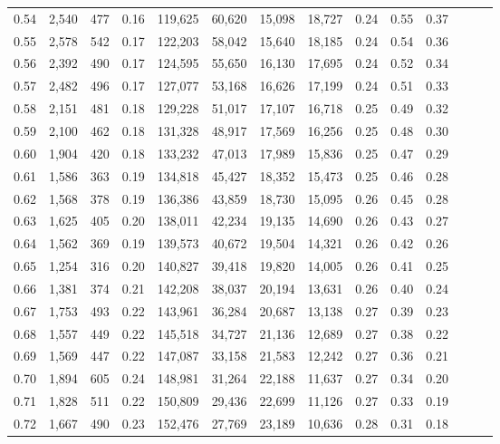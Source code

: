 \begin{tabular}{rrrrrrrrrrrrrr}
0.54 &  2,540 &  477 &  0.16 &  119,625 &   60,620 &  15,098 &  18,727 &  0.24 &  0.55 &      0.37 \\
0.55 &  2,578 &  542 &  0.17 &  122,203 &   58,042 &  15,640 &  18,185 &  0.24 &  0.54 &      0.36 \\
0.56 &  2,392 &  490 &  0.17 &  124,595 &   55,650 &  16,130 &  17,695 &  0.24 &  0.52 &      0.34 \\
0.57 &  2,482 &  496 &  0.17 &  127,077 &   53,168 &  16,626 &  17,199 &  0.24 &  0.51 &      0.33 \\
0.58 &  2,151 &  481 &  0.18 &  129,228 &   51,017 &  17,107 &  16,718 &  0.25 &  0.49 &      0.32 \\
0.59 &  2,100 &  462 &  0.18 &  131,328 &   48,917 &  17,569 &  16,256 &  0.25 &  0.48 &      0.30 \\
0.60 &  1,904 &  420 &  0.18 &  133,232 &   47,013 &  17,989 &  15,836 &  0.25 &  0.47 &      0.29 \\
0.61 &  1,586 &  363 &  0.19 &  134,818 &   45,427 &  18,352 &  15,473 &  0.25 &  0.46 &      0.28 \\
0.62 &  1,568 &  378 &  0.19 &  136,386 &   43,859 &  18,730 &  15,095 &  0.26 &  0.45 &      0.28 \\
0.63 &  1,625 &  405 &  0.20 &  138,011 &   42,234 &  19,135 &  14,690 &  0.26 &  0.43 &      0.27 \\
0.64 &  1,562 &  369 &  0.19 &  139,573 &   40,672 &  19,504 &  14,321 &  0.26 &  0.42 &      0.26 \\
0.65 &  1,254 &  316 &  0.20 &  140,827 &   39,418 &  19,820 &  14,005 &  0.26 &  0.41 &      0.25 \\
0.66 &  1,381 &  374 &  0.21 &  142,208 &   38,037 &  20,194 &  13,631 &  0.26 &  0.40 &      0.24 \\
0.67 &  1,753 &  493 &  0.22 &  143,961 &   36,284 &  20,687 &  13,138 &  0.27 &  0.39 &      0.23 \\
0.68 &  1,557 &  449 &  0.22 &  145,518 &   34,727 &  21,136 &  12,689 &  0.27 &  0.38 &      0.22 \\
0.69 &  1,569 &  447 &  0.22 &  147,087 &   33,158 &  21,583 &  12,242 &  0.27 &  0.36 &      0.21 \\
0.70 &  1,894 &  605 &  0.24 &  148,981 &   31,264 &  22,188 &  11,637 &  0.27 &  0.34 &      0.20 \\
0.71 &  1,828 &  511 &  0.22 &  150,809 &   29,436 &  22,699 &  11,126 &  0.27 &  0.33 &      0.19 \\
0.72 &  1,667 &  490 &  0.23 &  152,476 &   27,769 &  23,189 &  10,636 &  0.28 &  0.31 &      0.18 \\

\end{tabular}

